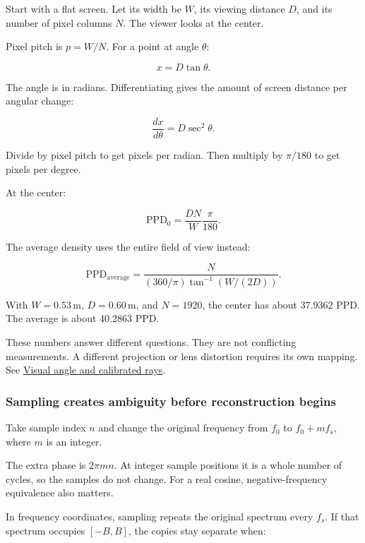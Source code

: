 \hypertarget{04-visual-computing-ii-ch042-why-local-pixels-per-degree-is-not-the-average}{}

Start with a flat screen. Let its width be \(W\), its viewing distance \(D\), and its number of pixel columns \(N\). The viewer looks at the center.

Pixel pitch is \(p=W/N\). For a point at angle \(\theta\):

\[
x=D\tan\theta.
\]

The angle is in radians. Differentiating gives the amount of screen distance per angular change:

\[
\frac{dx}{d\theta}=D\sec^2\theta.
\]

Divide by pixel pitch to get pixels per radian. Then multiply by \(\pi/180\) to get pixels per degree.

At the center:

\[
\mathrm{PPD}_0=\frac{DN}{W}\frac{\pi}{180}.
\]

The average density uses the entire field of view instead:

\[
\mathrm{PPD}_{\mathrm{average}}
=\frac{N}{(360/\pi)\tan^{-1}(W/(2D))}.
\]

With \(W=0.53\,\mathrm{m}\), \(D=0.60\,\mathrm{m}\), and \(N=1920\), the center has about 37.9362 PPD. The average is about 40.2863 PPD.

These numbers answer different questions. They are not conflicting measurements. A different projection or lens distortion requires its own mapping. See \hyperref[appendix-7d356c396d1a]{Visual angle and calibrated rays}.

\subsubsection{Sampling creates ambiguity before reconstruction begins}\label{04-visual-computing-ii-ch042-sampling-creates-ambiguity-before-reconstruction-begins}

\hypertarget{04-visual-computing-ii-ch042-sampling-creates-ambiguity-before-reconstruction-begins}{}

Take sample index \(n\) and change the original frequency from \(f_0\) to \(f_0+mf_s\), where \(m\) is an integer.

The extra phase is \(2\pi mn\). At integer sample positions it is a whole number of cycles, so the samples do not change. For a real cosine, negative-frequency equivalence also matters.

In frequency coordinates, sampling repeats the original spectrum every \(f_s\). If that spectrum occupies \([-B,B]\), the copies stay separate when:

